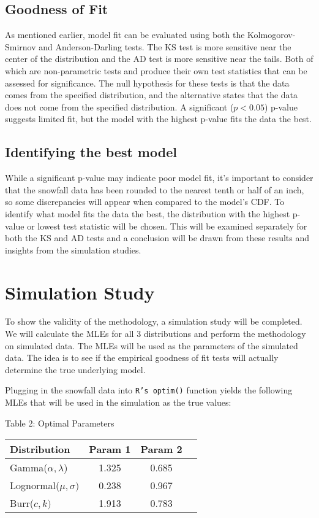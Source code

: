 \documentclass[letterpaper,12pt]{article}
\begin{document}
\subsection{Goodness of Fit}
As mentioned earlier, model fit can be evaluated using both the Kolmogorov-Smirnov and Anderson-Darling tests. The KS test is more sensitive near the center of the distribution and the AD test is more sensitive near the tails. Both of which are non-parametric tests and produce their own test statistics that can be assessed for significance. The null hypothesis for these tests is that the data comes from the specified distribution, and the alternative states that the data does not come from the specified distribution. A significant ($p<0.05$) p-value suggests limited fit, but the model with the highest p-value fits the data the best.  


\subsection{Identifying the best model}
While a significant p-value may indicate poor model fit, it's important to consider that the snowfall data has been rounded to the nearest tenth or half of an inch, so some discrepancies will appear when compared to the model's CDF. To identify what model fits the data the best, the distribution with the highest p-value or lowest test statistic will be chosen. This will be examined separately for both the KS and AD tests and a conclusion will be drawn from these results and insights from the simulation studies. 

\section{Simulation Study}
To show the validity of the methodology, a simulation study will be completed. We will calculate the MLEs for all 3 distributions and perform the methodology on simulated data. The MLEs will be used as the parameters of the simulated data. The idea is to see if the empirical goodness of fit tests will actually determine the true underlying model. 

Plugging in the snowfall data into \texttt{R's optim()} function yields the following MLEs that will be used in the simulation as the true values:
\begin{center}
\begin{table}[H]
Table 2: Optimal Parameters \\
\begin{tabular}{ |p{1.25in}|c|c|c| } 
\hline
Distribution &  Param 1 & Param 2 \\
\hline
Gamma($\alpha, \lambda$) & 1.325 & 0.685 \\ 
 Lognormal($\mu,\sigma)$ & 0.238 & 0.967 \\ 
 Burr($c,k)$ & 1.913 & 0.783 \\ 
\hline
\end{tabular}
\end{table}
\end{center}
\end{document}
